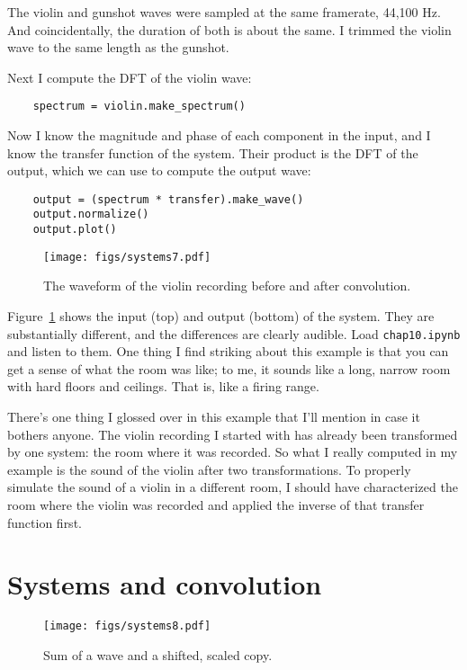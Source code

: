 The violin and gunshot waves were sampled at the same framerate,
44,100 Hz.  And coincidentally, the duration of both is about the
same.  I trimmed the violin wave to the same length as the gunshot.

Next I compute the DFT of the violin wave:

\begin{verbatim}
	spectrum = violin.make_spectrum()
\end{verbatim}

Now I know the magnitude and phase of each component in the
input, and I know the transfer function of the system.  Their
product is the DFT of the output, which we can use to compute the
output wave:

\begin{verbatim}
	output = (spectrum * transfer).make_wave()
	output.normalize()
	output.plot()
\end{verbatim}

\begin{figure}
	\centerline{\texttt{[image: figs/systems7.pdf]}}
	\caption{The waveform of the violin recording before and after convolution.}
	\label{fig.systems7}
\end{figure}

Figure~\ref{fig.systems7} shows the input (top) and output (bottom) of
the system.  They are substantially different, and the differences are
clearly audible.  Load {\tt chap10.ipynb} and listen to them.  One
thing I find striking about this example is that you can get a sense
of what the room was like; to me, it sounds like a long, narrow room
with hard floors and ceilings.  That is, like a firing range.

There's one thing I glossed over in this example that I'll mention
in case it bothers anyone.  The violin recording I started with
has already been transformed by one system: the room where it was
recorded.  So what I really computed in my example is the sound
of the violin after two transformations.  To properly simulate
the sound of a violin in a different room, I should have characterized
the room where the violin was recorded and applied the inverse
of that transfer function first.


\section{Systems and convolution}
\label{sysconv}

\begin{figure}
	\centerline{\texttt{[image: figs/systems8.pdf]}}
	\caption{Sum of a wave and a shifted, scaled copy.}
	\label{fig.systems8}
\end{figure}


